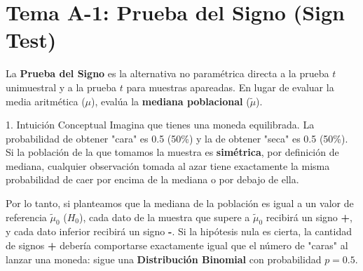 \documentclass[11pt,a4paper]{article}
\begin{document}
\section{Tema A-1: Prueba del Signo (Sign Test)}

La \textbf{Prueba del Signo} es la alternativa no paramétrica directa a la prueba $t$ unimuestral y a la prueba $t$ para muestras apareadas. En lugar de evaluar la media aritmética ($\mu$), evalúa la \textbf{mediana poblacional} ($\tilde{\mu}$).

\begin{subsection}{1. Intuición Conceptual}
    Imagina que tienes una moneda equilibrada. La probabilidad de obtener "cara" es 0.5 (50\%) y la de obtener "seca" es 0.5 (50\%). Si la población de la que tomamos la muestra es \textbf{simétrica}, por definición de mediana, cualquier observación tomada al azar tiene exactamente la misma probabilidad de caer por encima de la mediana o por debajo de ella.
    
    Por lo tanto, si planteamos que la mediana de la población es igual a un valor de referencia $\tilde{\mu}_0$ ($H_0$), cada dato de la muestra que supere a $\tilde{\mu}_0$ recibirá un signo \textbf{\textbf{+}}, y cada dato inferior recibirá un signo \textbf{\textbf{-}}. Si la hipótesis nula es cierta, la cantidad de signos \textbf{\textbf{+}} debería comportarse exactamente igual que el número de "caras" al lanzar una moneda: sigue una \textbf{Distribución Binomial} con probabilidad $p = 0.5$.
\end{subsection}
\end{document}
